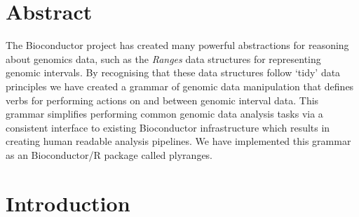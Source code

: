 \documentclass[10pt,letterpaper]{article}
\date{}
\newcommand{\getIndex}[2]{
  \ForEach{,}{\IfEq{#1}{\thislevelitem}{\number\thislevelcount\ExitForEach}{}}{#2}
}
\newcommand{\getAff}[1]{
  \getIndex{#1}{Monash University,Genentech}
}
\begin{document}
\vspace*{0.2in}

\section*{Abstract}
The Bioconductor project has created many powerful abstractions for
reasoning about genomics data, such as the \emph{Ranges} data structures
for representing genomic intervals. By recognising that these data
structures follow `tidy' data principles we have created a grammar of
genomic data manipulation that defines verbs for performing actions on
and between genomic interval data. This grammar simplifies performing
common genomic data analysis tasks via a consistent interface to
existing Bioconductor infrastructure which results in creating human
readable analysis pipelines. We have implemented this grammar as an
Bioconductor/R package called plyranges.


\linenumbers

\section{Introduction}\label{introduction}
\end{document}
